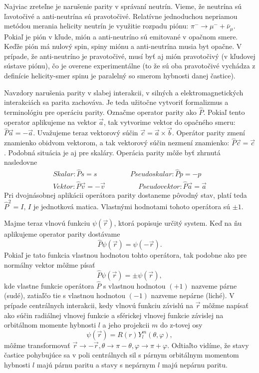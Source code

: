 \documentclass[../../main.tex]{subfiles}
\begin{document}
Najviac zreteľne je narušenie parity v správaní neutrín. Vieme, že neutrína sú ľavotočivé a anti-neutrína sú pravotočivé. Relatívne jednoduchou nepriamou metódou merania helicity neutrín je využitie rozpadu piónu: $\pi^- \rightarrow \mu^-+\bar{\nu}_{\mu}$. Pokiaľ je pión v kľude, mión a anti-neutríno sú emitované v opačnom smere. Keďže pión má nulový spin, spiny miónu a anti-neutrína musia byt opačne. V prípade, že anti-neutríno je pravotočivé, musí byť aj mión pravotočivý (v kľudovej sústave piónu), čo je overene experimentálne (to že sú oba pravotočivé vychádza z definície helicity-smer spinu je paralelný so smerom hybnosti danej častice).

Navzdory narušenia parity v slabej interakcii, v silných a elektromagnetických interakciách sa parita zachováva. Je teda užitočne vytvoriť formalizmus a terminológiu pre operáciu parity. Označme operator parity ako $\hat{P}$. Pokiaľ tento operator aplikujeme na vektor $\vec{a}$, tak vytvorime vektor do opačného smeru: $\hat{P}\vec{a}=-\vec{a}$. Uvažujeme teraz vektorový súčin $\vec{c}=\vec{a}\times \vec{b}$. Operátor parity zmení znamienko obidvom vektorom, a tak vektorový súčin nezmení znamienko: $\hat{P}\vec{c}=\vec{c}$. Podobná situácia je aj pre skaláry. Operácia parity môže byť zhrnutá nasledovne 
\begin{equation*}
\begin{gathered}
Skalar: \hat{P}s=s  \hspace{2cm} Pseudoskalar: \hat{P}p=-p    \\
Vektor: \hat{P}\vec{v}=-\vec{v}  \hspace{2cm} Pseudovektor: \hat{P}\vec{a}=\vec{a}
\end{gathered}
\end{equation*}
Pri dvojnásobnej aplikácii operátora parity dostaneme pôvodný stav, platí teda $\hat{P}^2=I$, $I$ je jednotková matica. Vlastnými hodnotami tohoto operátora sú $\pm1$.

Majme teraz vlnovú funkciu $\psi(\vec{r})$, ktorá popisuje určitý system. Keď na ňu aplikujeme operator parity dostávame $$ \hat{P}\psi(\vec{r})=\psi(-\vec{r}).$$ Pokiaľ je tato funkcia vlastnou hodnotou tohto operátora, tak podobne ako pre normálny vektor môžme písať
$$ \hat{P}\psi(\vec{r})=\pm \psi(\vec{r}),$$ kde vlastne funkcie operátora $\hat{P}$ s vlastnou hodnotou $(+1)$ nazveme párne (sudé), zatiaľčo tie s vlastnou hodnotou $(-1)$ nazveme nepárne (liché). V prípade centrálnych interakcii, kedy vlnovú funkciu závislú na $\vec{r}$ môžme napísať ako súčin radiálnej vlnovej funkcie a sférickej vlnovej funkcie závislej na orbitálnom momente hybnosti $l$ a jeho projekcii $m$ do z-tovej osy $$ \psi(\vec{r})= R(r)Y_l^m(\theta, \varphi),$$ môžme transformovať $\vec{r}\rightarrow -\vec{r},\theta\rightarrow \pi - \theta,\varphi\rightarrow \pi+\varphi$. Odtiaľto vidíme, že stavy častice pohybujúce sa v poli centrálnych sil s párnym orbitálnym momentom hybnosti $l$ majú párnu paritu a stavy s nepárnym $l$ majú nepárnu paritu.
\end{document}
